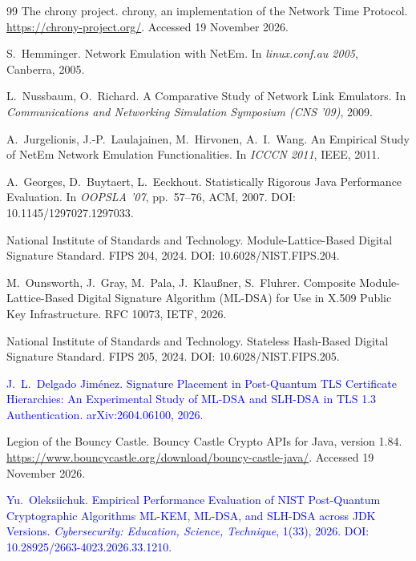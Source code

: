 \documentclass[conference,a4paper]{IEEEtran}
\newcommand{\newtext}[1]{{\color{blue}#1}}
\begin{document}
\begin{thebibliography}{99}
\newtext{The chrony project.
\newblock chrony, an implementation of the Network Time Protocol.
\newblock \url{https://chrony-project.org/}.
\newblock Accessed 19 November 2026.}

S.~Hemminger.
\newblock Network Emulation with NetEm.
\newblock In \emph{linux.conf.au 2005}, Canberra, 2005.

L.~Nussbaum, O.~Richard.
\newblock A Comparative Study of Network Link Emulators.
\newblock In \emph{Communications and Networking Simulation Symposium (CNS '09)}, 2009.

A.~Jurgelionis, J.-P.~Laulajainen, M.~Hirvonen, A.~I.~Wang.
\newblock An Empirical Study of NetEm Network Emulation Functionalities.
\newblock In \emph{ICCCN 2011}, IEEE, 2011.

A.~Georges, D.~Buytaert, L.~Eeckhout.
\newblock Statistically Rigorous Java Performance Evaluation.
\newblock In \emph{OOPSLA '07}, pp.~57--76, ACM, 2007.
\newblock DOI: 10.1145/1297027.1297033.

National Institute of Standards and Technology.
\newblock Module-Lattice-Based Digital Signature Standard.
\newblock FIPS 204, 2024.
\newblock DOI: 10.6028/NIST.FIPS.204.

M.~Ounsworth, J.~Gray, M.~Pala, J.~Klau{\ss}ner, S.~Fluhrer.
\newblock Composite Module-Lattice-Based Digital Signature Algorithm (ML-DSA) for Use in X.509
Public Key Infrastructure.
\newblock RFC 10073, IETF, 2026.

National Institute of Standards and Technology.
\newblock Stateless Hash-Based Digital Signature Standard.
\newblock FIPS 205, 2024.
\newblock DOI: 10.6028/NIST.FIPS.205.

\textcolor{blue}{J.~L.~Delgado Jim{\'e}nez.
\newblock Signature Placement in Post-Quantum TLS Certificate Hierarchies: An Experimental Study of
ML-DSA and SLH-DSA in TLS 1.3 Authentication.
\newblock arXiv:2604.06100, 2026.}

\newtext{Legion of the Bouncy Castle.
\newblock Bouncy Castle Crypto APIs for Java, version 1.84.
\newblock \url{https://www.bouncycastle.org/download/bouncy-castle-java/}.
\newblock Accessed 19 November 2026.}

\textcolor{blue}{Yu.~Oleksiichuk.
\newblock Empirical Performance Evaluation of NIST Post-Quantum Cryptographic Algorithms ML-KEM, ML-DSA,
and SLH-DSA across JDK Versions.
\newblock \emph{Cybersecurity: Education, Science, Technique}, 1(33), 2026.
\newblock DOI: 10.28925/2663-4023.2026.33.1210.}


\end{thebibliography}
\end{document}
